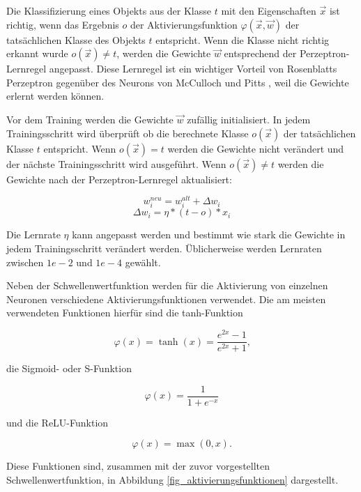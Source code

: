 Die Klassifizierung eines Objekts aus der Klasse $t$ mit den Eigenschaften $\vec{x}$ ist richtig, wenn das Ergebnis $o$ der Aktivierungsfunktion $\varphi(\vec{x},\vec{w})$ der tatsächlichen Klasse des Objekts $t$ entspricht. Wenn die Klasse nicht richtig erkannt wurde $o(\vec{x}) \neq t$, werden die Gewichte $\vec{w}$ entsprechend der Perzeptron-Lernregel angepasst. Diese Lernregel ist ein wichtiger Vorteil von Rosenblatts Perzeptron \cite{rosenblatt1958perceptron} gegenüber des Neurons von McCulloch und Pitts \cite{mcculloch1943logical}, weil die Gewichte erlernt werden können.

Vor dem Training werden die Gewichte $\vec{w}$ zufällig initialisiert. In jedem Trainingsschritt wird überprüft ob die berechnete Klasse $o(\vec{x})$ der tatsächlichen Klasse $t$ entspricht. Wenn $o(\vec{x}) = t$ werden die Gewichte nicht verändert und der nächste Trainingsschritt wird ausgeführt. Wenn $o(\vec{x}) \neq t$ werden die Gewichte nach der Perzeptron-Lernregel aktualisiert:

\begin{equation}
w^{neu}_i = w^{alt}_i + \Delta w_i
\end{equation}
\begin{equation}
\Delta w_i = \eta*(t-o)*x_i
\end{equation}

Die Lernrate $\eta$ kann angepasst werden und bestimmt wie stark die Gewichte in jedem Trainingsschritt verändert werden. Üblicherweise werden Lernraten zwischen $1e-2$ und $1e-4$ gewählt.

Neben der Schwellenwertfunktion werden für die Aktivierung von einzelnen Neuronen verschiedene Aktivierungsfunktionen verwendet. Die am meisten verwendeten Funktionen hierfür sind die \ac{tanh}-Funktion

\begin{equation}
\varphi(x) = \tanh(x) = \frac{e^{2x}-1}{e^{2x}+1} \text{,}
\end{equation}

\noindent die Sigmoid- oder S-Funktion

\begin{equation}
\varphi(x) = \frac{1}{1+e^{-x}}
\end{equation}

\noindent und die \ac{ReLU}-Funktion 

\begin{equation}
\varphi(x) = \max{(0, x)}.
\end{equation}

\noindent Diese Funktionen sind, zusammen mit der zuvor vorgestellten Schwellenwertfunktion, in Abbildung \ref{fig_aktivierungsfunktionen} dargestellt.

